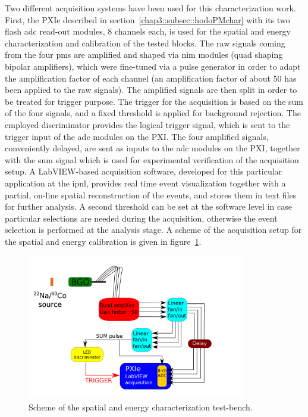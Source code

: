 Two different acquisition systems have been used for this characterization work. First, the PXIe described in section~\ref{chap3::subsec::hodoPMchar} with its two flash \gls{adc} read-out modules, 8 channels each, is used for the spatial and energy characterization and calibration of the tested blocks. The raw signals coming from the four \glspl{pm} are amplified and shaped via \gls{nim} modules (quad shaping bipolar amplifiers), which were fine-tuned via a pulse generator in order to adapt the amplification factor of each channel (an amplification factor of about 50 has been applied to the raw signals). The amplified signals are then split in order to be treated for trigger purpose. The trigger for the acquisition is based on the sum of the four signals, and a fixed threshold is applied for background rejection. The employed discriminator provides the logical trigger signal, which is sent to the trigger input of the \gls{adc} modules on the PXI. The four amplified signals, conveniently delayed, are sent as inputs to the \gls{adc} modules on the PXI, together with the sum signal which is used for experimental verification of the acquisition setup. A LabVIEW-based acquisition software, developed for this particular application at the \gls{ipnl}, provides real time event visualization together with a partial, on-line spatial reconstruction of the events, and stores them in text files for further analysis. A second threshold can be set at the software level in case particular selections are needed during the acquisition, otherwise the event selection is performed at the analysis stage. A scheme of the acquisition setup for the spatial and energy calibration is given in figure~\ref{chap3::fig::space_en_meas_scheme}.

\begin{figure} [!h]
\centering
\includegraphics[width=0.85\textwidth]{03_GraphicFiles/chapter3_CLaRySproto/Absorber/images/daq_calib_scheme.png}
\caption{Scheme of the spatial and energy characterization test-bench.}
\label{chap3::fig::space_en_meas_scheme}
\end{figure}

